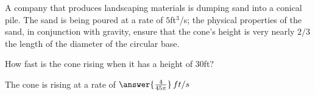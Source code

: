 \documentclass{ximera}
\author{Gregory Hartman \and Matthew Carr}
\begin{document}
\begin{exercise}




A company that produces landscaping materials is dumping sand into a conical pile. The sand is being poured at a rate of $5$ft$^3$/s; the physical properties of the sand, in conjunction with gravity, ensure that the cone's height is very nearly $2/3$ the length of the diameter of the circular base. 

How fast is the cone rising when it has a height of $30$ft?
\begin{center}
The cone is rising at a rate of $\answer{\frac{4}{45\pi}}\,ft/s$
\end{center}


\end{exercise}
\end{document}
